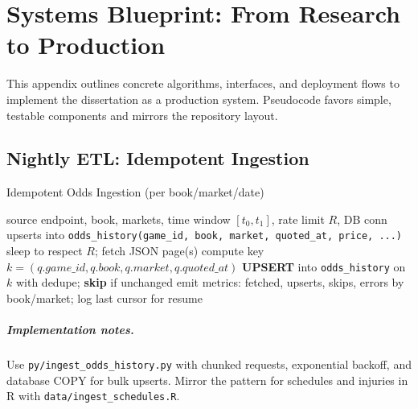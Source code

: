 \chapter[Systems Blueprint]{Systems Blueprint: From Research to Production}
\label{app:systems-blueprint}

\begingroup\sloppy

This appendix outlines concrete algorithms, interfaces, and deployment flows to implement the dissertation as a production system. Pseudocode favors simple, testable components and mirrors the repository layout.

\section{Nightly ETL: Idempotent Ingestion}
\begin{algorithm}[H]\small
  \caption{Idempotent Odds Ingestion (per book/market/date)}
  \label{alg:ingest-odds}
  \begin{algorithmic}[1]
    \Require source endpoint, book, markets, time window $[t_0,t_1]$, rate limit $R$, DB conn
    \Ensure upserts into \texttt{odds\_history(game\_id, book, market, quoted\_at, price, ...)}
      \State sleep to respect $R$; fetch JSON page(s)
        \State compute key $k=(q.game\_id,q.book,q.market,q.quoted\_at)$
        \State \textbf{UPSERT} into \texttt{odds\_history} on $k$ with dedupe; \textbf{skip} if unchanged
      \EndFor
    \EndFor
    \State emit metrics: {fetched, upserts, skips, errors} by book/market; log last cursor for resume
  \end{algorithmic}
\end{algorithm}

\endgroup

\paragraph{Implementation notes.} Use \texttt{py/ingest\_odds\_history.py} with chunked requests, exponential backoff, and database COPY for bulk upserts. Mirror the pattern for schedules and injuries in R with \texttt{data/ingest\_schedules.R}.

